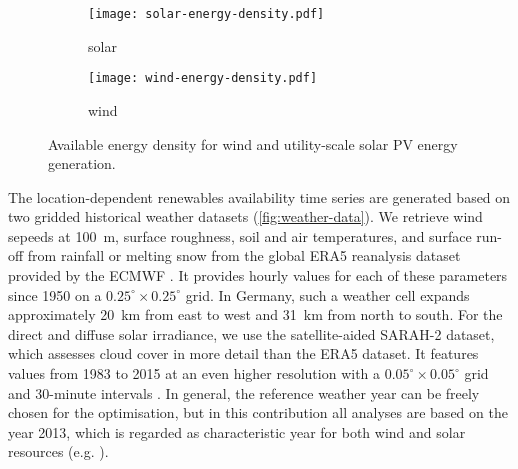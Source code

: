 \begin{figure}
    \centering
    \begin{subfigure}[t]{0.49\textwidth}
        \centering
        \caption{solar}
        \texttt{[image: solar-energy-density.pdf]}
    \end{subfigure}
    \begin{subfigure}[t]{0.49\textwidth}
        \centering
        \caption{wind}
        \texttt{[image: wind-energy-density.pdf]}
    \end{subfigure}
    \caption{Available energy density for wind and utility-scale solar PV energy generation.}
    \label{fig:energy-density}
\end{figure}

The location-dependent renewables availability time series are generated based
on two gridded historical weather datasets (\cref{fig:weather-data}). We
retrieve wind sepeeds at \SI{100}{\metre}, surface roughness, soil and air
temperatures, and surface run-off from rainfall or melting snow from the global
ERA5 reanalysis dataset provided by the ECMWF \citeS{}. It provides hourly
values for each of these parameters since 1950 on a $0.25^{\circ} \times
0.25^{\circ}$ grid. In Germany, such a weather cell expands approximately
\SI{20}{\kilo\metre} from east to west and \SI{31}{km} from north to south. For
the direct and diffuse solar irradiance, we use the satellite-aided SARAH-2
dataset, which assesses cloud cover in more detail than the ERA5 dataset. It
features values from 1983 to 2015 at an even higher resolution with a
$0.05^{\circ} \times 0.05^{\circ}$ grid and 30-minute intervals \citeS{}. In
general, the reference weather year can be freely chosen for the optimisation,
but in this contribution all analyses are based on the year 2013, which is
regarded as characteristic year for both wind and solar resources (e.g.
\citeS{}).

